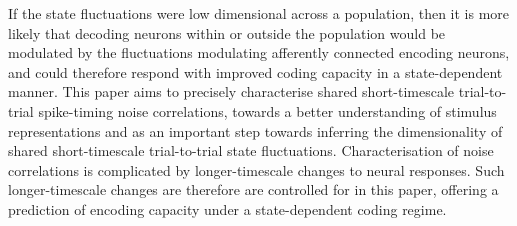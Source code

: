 \documentclass{article}
\begin{document}
If the state fluctuations were low dimensional across a population, then it is more likely that decoding neurons within or outside the population would be modulated by the fluctuations modulating afferently connected encoding neurons, and could therefore respond with improved coding capacity in a state-dependent manner.
This paper aims to precisely characterise shared short-timescale trial-to-trial spike-timing noise correlations, towards a better understanding of stimulus representations and as an important step towards inferring the dimensionality of shared short-timescale trial-to-trial state fluctuations. 
Characterisation of noise correlations is complicated by longer-timescale changes to neural responses. Such longer-timescale changes are therefore are controlled for in this paper, offering a prediction of encoding capacity under a state-dependent coding regime.










\end{document}
